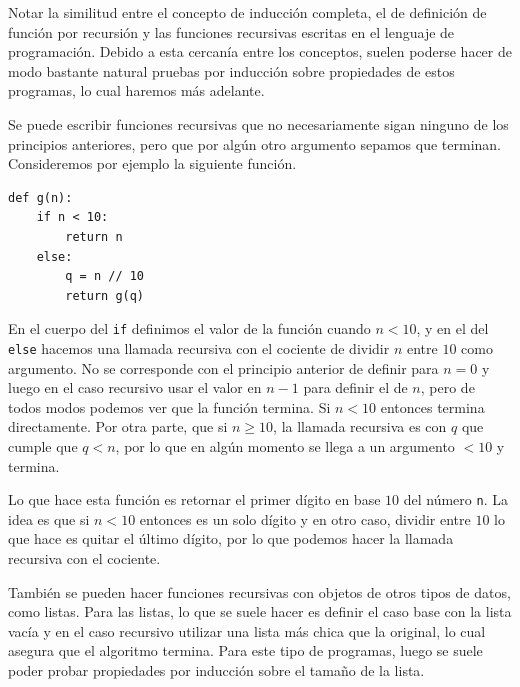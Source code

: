 \documentclass[a4paper, 12pt]{report}
\theoremstyle{definition}
\begin{document}
Notar la similitud entre el concepto de inducción completa, el de definición de función por recursión y las funciones recursivas escritas en el lenguaje de programación. Debido a esta cercanía entre los conceptos, suelen poderse hacer de modo bastante natural pruebas por inducción sobre propiedades de estos programas, lo cual haremos más adelante.

Se puede escribir funciones recursivas que no necesariamente sigan ninguno de los principios anteriores, pero que por algún otro argumento sepamos que terminan. Consideremos por ejemplo la siguiente función.
\begin{verbatim}
def g(n):
    if n < 10:
        return n
    else:
        q = n // 10
        return g(q)
\end{verbatim}
En el cuerpo del {\tt if} definimos el valor de la función cuando $n<10$, y en el del {\tt else} hacemos una llamada recursiva con el cociente de dividir $n$ entre $10$ como argumento. No se corresponde con el principio anterior de definir para $n=0$ y luego en el caso recursivo usar el valor en $n-1$ para definir el de $n$, pero de todos modos podemos ver que la función termina. Si $n<10$ entonces termina directamente. Por otra parte, que si $n\geq 10$, la llamada recursiva es con $q$ que cumple que $q<n$, por lo que en algún momento se llega a un argumento $<10$ y termina.

Lo que hace esta función es retornar el primer dígito en base $10$ del número {\tt n}. La idea es que si $n<10$ entonces es un solo dígito y en otro caso, dividir entre $10$ lo que hace es quitar el último dígito, por lo que podemos hacer la llamada recursiva con el cociente.

También se pueden hacer funciones recursivas con objetos de otros tipos de datos, como listas. Para las listas, lo que se suele hacer es definir el caso base con la lista vacía y en el caso recursivo utilizar una lista más chica que la original, lo cual asegura que el algoritmo termina. Para este tipo de programas, luego se suele poder probar propiedades por inducción sobre el tamaño de la lista.
\end{document}
